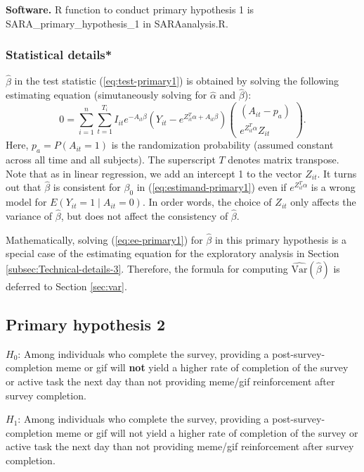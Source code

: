 \documentclass[11pt]{article}
\begin{document}
\textbf{Software.} R function to conduct primary hypothesis 1 is
\textsf{SARA\_primary\_hypothesis\_1} in \textsf{SARAanalysis.R}.

\subsubsection{Statistical details{*} \label{subsec:Technical-details-1}}

$\hat{\beta}$ in the test statistic (\ref{eq:test-primary1}) is
obtained by solving the following estimating equation (simutaneously
solving for $\hat{\alpha}$ and $\hat{\beta}$):
\begin{equation}
0=\sum_{i=1}^{n}\sum_{t=1}^{T_i} I_{it} e^{-A_{it}\beta}\left(Y_{it}-e^{Z_{it}^{T}\alpha+A_{it}\beta}\right)\begin{pmatrix}(A_{it}-p_{a})\\
e^{Z_{it}^{T}\alpha}Z_{it}
\end{pmatrix}.\label{eq:ee-primary1}
\end{equation}
Here, $p_{a}=P(A_{it}=1)$ is the randomization probability (assumed
constant across all time and all subjects). The superscript $T$ denotes
matrix transpose. Note that as in linear regression, we add an intercept
1 to the vector $Z_{it}$. It turns out that $\hat{\beta}$ is consistent
for $\beta_{0}$ in (\ref{eq:estimand-primary1}) even if $e^{Z_{it}^{T}\alpha}$
is a wrong model for $E(Y_{it}=1\mid A_{it}=0)$. In order words,
the choice of $Z_{it}$ only affects the variance of $\hat{\beta}$,
but does not affect the consistency of $\hat{\beta}$.

Mathematically, solving (\ref{eq:ee-primary1}) for $\hat{\beta}$
in this primary hypothesis is a special case of the estimating equation for the exploratory analysis
in Section \ref{subsec:Technical-details-3}. Therefore, the formula for
computing $\widehat{\text{Var}}(\hat{\beta})$ is deferred to Section
\ref{sec:var}.

\subsection{Primary hypothesis 2\label{subsec:Primary-hypothesis-2}}

$H_{0}$: Among individuals who complete the survey, providing a post-survey-completion
meme or gif will \textbf{not} yield a higher rate of completion of
the survey or active task the next day than not providing meme/gif
reinforcement after survey completion.

$H_{1}$: Among individuals who complete the survey, providing a post-survey-completion
meme or gif will not yield a higher rate of completion of the survey
or active task the next day than not providing meme/gif reinforcement
after survey completion.
\end{document}
